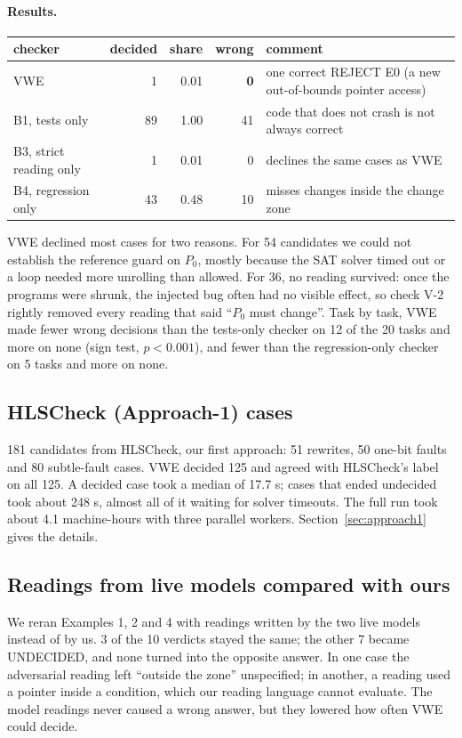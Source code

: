 \documentclass[10pt,a4paper]{article}
\newcommand{\Pz}{P_0}\newcommand{\Po}{P_1}
\begin{document}
\paragraph{Results.}
\begin{center}\small
\begin{tabular}{@{}lrrrl@{}}\toprule
checker & decided & share & wrong & comment\\\midrule
VWE & 1 & 0.01 & \textbf{0} & one correct REJECT E0 (a new out-of-bounds pointer access)\\
B1, tests only & 89 & 1.00 & 41 & code that does not crash is not always correct\\
B3, strict reading only & 1 & 0.01 & 0 & declines the same cases as VWE\\
B4, regression only & 43 & 0.48 & 10 & misses changes inside the change zone\\\bottomrule
\end{tabular}\end{center}
\noindent VWE declined most cases for two reasons. For 54 candidates we could not establish the
reference guard on $\Pz$, mostly because the SAT solver timed out or a loop needed more unrolling
than allowed. For 36, no reading survived: once the programs were shrunk, the injected bug often had
no visible effect, so check V-2 rightly removed every reading that said ``$\Pz$ must change''. Task
by task, VWE made fewer wrong decisions than the tests-only checker on 12 of the 20 tasks and more on
none (sign test, $p<0.001$), and fewer than the regression-only checker on 5 tasks and more on none.

\subsection{HLSCheck (Approach-1) cases}
181 candidates from HLSCheck, our first approach: 51 rewrites, 50 one-bit faults and 80 subtle-fault
cases. VWE decided 125 and agreed with HLSCheck's label on all 125. A decided case took a median of
17.7 s; cases that ended undecided took about 248 s, almost all of it waiting for solver timeouts.
The full run took about 4.1 machine-hours with three parallel workers. Section~\ref{sec:approach1}
gives the details.

\subsection{Readings from live models compared with ours}
We reran Examples 1, 2 and 4 with readings written by the two live models instead of by us. 3 of
the 10 verdicts stayed the same; the other 7 became UNDECIDED, and none turned into the opposite
answer. In one case the adversarial reading left ``outside the zone'' unspecified; in another, a
reading used a pointer inside a condition, which our reading language cannot evaluate. The model
readings never caused a wrong answer, but they lowered how often VWE could decide.
\end{document}
